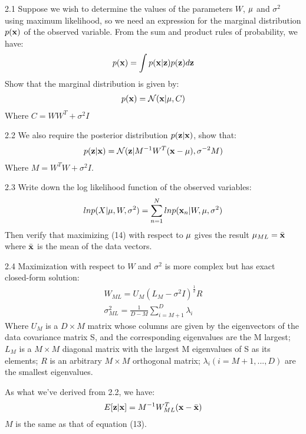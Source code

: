 \documentclass{article}
\theoremstyle{definition}
\theoremstyle{definition}
\theoremstyle{remark}
\begin{document}
2.1 Suppose we wish to determine the values of the parameters $W$, $\bold{\mu}$ and $\sigma^{2}$ using maximum likelihood, so we need an expression for the marginal distribution $p(\bold{x})$ of the observed variable. From the sum and product rules of probability, we have:
\begin{eqnarray}
p(\bold{x})=\int p(\bold{x}|\bold{z})p(\bold{z})d\bold{z}
\end{eqnarray}
Show that the marginal distribution is given by:
\begin{eqnarray}
p(\bold{x})=\mathcal{N}(\bold{x}|\bold{\mu}, C)
\end{eqnarray}
Where $C=WW^{T}+\sigma^{2}I$

2.2 We also require the posterior distribution $p(\bold{z}|\bold{x})$, show that:
\begin{eqnarray}
p(\bold{z}|\bold{x})=\mathcal{N}(\bold{z}|M^{-1}W^{T}(\bold{x}-\bold{\mu}),\sigma^{-2}M)
\end{eqnarray}
Where $M=W^{T}W+\sigma^{2}I$.

2.3 Write down the log likelihood function of the observed variables:
\begin{eqnarray}
lnp(X|\bold{\mu}, W, \sigma^{2})=\sum_{n=1}^{N}lnp(\bold{x}_{n}|W,\bold{\mu},\sigma^{2})
\end{eqnarray}
Then verify that maximizing (14) with respect to $\bold{\mu}$ gives the result $\bold{\mu}_{ML}=\bar{\bold{x}}$ where $\bar{\bold{x}}$ is the mean of the data vectors.

2.4 Maximization with respect to $W$ and $\sigma^{2}$ is more complex but has exact closed-form solution:
\begin{eqnarray}
W_{ML}=U_{M}(L_{M}-\sigma^{2}I)^{\frac{1}{2}}R \\
\sigma_{ML}^{2}=\frac{1}{D-M}\sum_{i=M+1}^{D}\lambda_{i}
\end{eqnarray}
Where $U_{M}$ is a $D\times M$ matrix whose columns are given by the eigenvectors of the data covariance matrix S, and the corresponding eigenvalues are the M largest; $L_{M}$ is a $M\times M$ diagonal matrix with the largest M eigenvalues of S as its elements; $R$ is an arbitrary $M\times M$ orthogonal matrix; $\lambda_{i}(i = M+1, ..., D)$ are the smallest eigenvalues.

As what we've derived from 2.2, we have:
\begin{eqnarray}
E[\bold{z}|\bold{x}]=M^{-1}W_{ML}^{T}(\bold{x}-\bar{\bold{x}})
\end{eqnarray}
$M$ is the same as that of equation (13).
\end{document}
